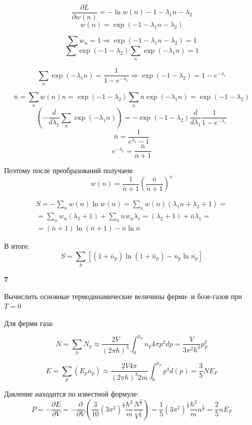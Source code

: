 \documentclass[a4paper,12pt]{article} %
\newcommand{\parder}[2]{\frac{\partial {#1}}{\partial {#2}}}
\begin{document}
\begin{task}
$$
\frac{\partial L}{\partial w(n)}=-\ln w(n)-1 -\lambda_1 n - \lambda_2
$$
$$
w(n)=\exp\left(-1-\lambda_{1} n-\lambda_{2}\right)
$$

$$
\sum w_{n}=1 \Rightarrow \exp \left(-1-\lambda_{1} n-\lambda_{2}\right)=1
$$
$$\sum
\exp \left(-1-\lambda_{2}\right) \sum_{n} \exp (-\lambda_1 n)=1
$$

$$
\sum_{n} \operatorname{exp}\left(-\lambda_{1} n\right)=
\frac{1}{1-e^{-\lambda_{1}}} \Rightarrow \operatorname{exp}\left(-1-\lambda_{2}\right)=1-e^{-\lambda_{1}}
$$


$$
\bar{n}=\sum_{n} w(n) n=\exp \left(-1-\lambda_{2}\right) \sum_{n} n 
\exp \left(-\lambda_{1} n\right)=\exp \left(-1-\lambda_{2}\right)
$$
\[ \left(-\frac{d}{d \lambda_1} \sum_{n} \exp \left(-\lambda_{1} n\right)\right)=-\exp \left(-1-\lambda_{2}\right) \frac{d}{d \lambda_{1}} \frac{1}{1-e^{-\lambda_{1}}} \]
%
\[ \bar{n}=\frac{1}{e^{\lambda_{1}}-1 } \]
\[ e^{-\lambda_{1}}=\frac{\bar{n}}{\bar{n}+1} \]




Поэтому после преобразований получаем:
$$
w(n)=\frac{1}{\bar{n}+1}
\left(\frac{\bar{n}}{\bar{n}+1}\right)^{n}
$$


\begin{multline}
S=-\sum_{n} w(n) \ln w(n)=\sum_{n} w(n)\left(\lambda_{1} n+\lambda_{2}+1\right) =\\
= \sum_{n} w_{n}\left(\lambda_{2}+1\right)+\sum_{n} n w_{n} \lambda_{1}=\left(\lambda_{2}+1\right)+\bar{n} \lambda_{1}=\\
=(\bar{n}+1) \ln (\bar{n}+1)-\bar{n} \ln \bar{n}
\end{multline}

В итоге:
$$
S=\sum_{p}\left[\left(1+\bar{n}_{p}\right) \ln \left(1+\bar{n}_{p}\right)-n_{p} \ln \overline{n_{p}}\right]
$$



\end{task}


\begin{task}\textbf{7}

Вычислить основные термодинамические величины ферми- и бозе-газов при $T=0$


Для ферми газа:

\[	N=\sum_{p}N_{p} \approx \frac{2 V}{(2 \pi \hbar)^{3}} \int_{0}^{p_{F}} n_{p} 4 \pi p^{2} dp=\frac{V}{3 \pi^{2} \hbar^{3}} p_{F}^{3} \]

\[ 
E=\sum_{p}\left(E_{p} n_{p}\right) \approx \frac{2 V 4 \pi}{(2 \pi \hbar)^{3} 2 m} \int_{0}^{p_{F}} p^{4} d(p)=\frac{3}{5} N E_{F}  \]

Давление находится по известной формуле:
\[ 	P=-\parder{E}{V}=
-\frac{\partial}{\partial V}\left(\frac{3}{10}\left(3 \pi^{2}\right)^{\frac{2}{3}} \frac{\hbar^{2}}{m} \frac{N^{\frac{5}{3}}}{V^{\frac{2}{3}}}\right)=
\frac{1}{5}\left(3 \pi^{2}\right)^{\frac{2}{3}} \frac{\hbar^{2}}{m} n^{\frac{5}{3}}=
\frac{2}{5} n E_{F} \]




\end{task}
\end{document}
